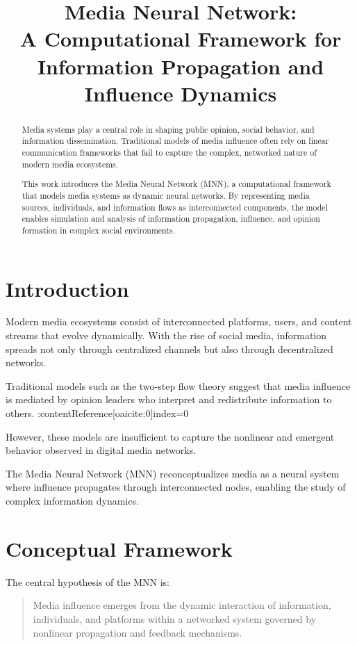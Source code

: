 \documentclass[12pt]{article}
\title{\textbf{Media Neural Network: \\ A Computational Framework for Information Propagation and Influence Dynamics}}
\author{}
\date{}
\begin{document}
\maketitle

\begin{abstract}
Media systems play a central role in shaping public opinion, social behavior, and information dissemination. Traditional models of media influence often rely on linear communication frameworks that fail to capture the complex, networked nature of modern media ecosystems.

This work introduces the Media Neural Network (MNN), a computational framework that models media systems as dynamic neural networks. By representing media sources, individuals, and information flows as interconnected components, the model enables simulation and analysis of information propagation, influence, and opinion formation in complex social environments.
\end{abstract}

\section{Introduction}

Modern media ecosystems consist of interconnected platforms, users, and content streams that evolve dynamically. With the rise of social media, information spreads not only through centralized channels but also through decentralized networks.

Traditional models such as the two-step flow theory suggest that media influence is mediated by opinion leaders who interpret and redistribute information to others. :contentReference[oaicite:0]{index=0}  

However, these models are insufficient to capture the nonlinear and emergent behavior observed in digital media networks.

The Media Neural Network (MNN) reconceptualizes media as a neural system where influence propagates through interconnected nodes, enabling the study of complex information dynamics.

\section{Conceptual Framework}

The central hypothesis of the MNN is:

\begin{quote}
Media influence emerges from the dynamic interaction of information, individuals, and platforms within a networked system governed by nonlinear propagation and feedback mechanisms.
\end{quote}
\end{document}
